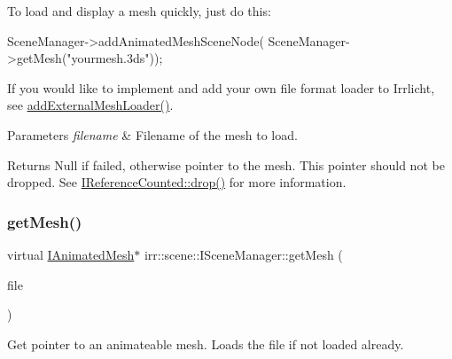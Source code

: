 To load and display a mesh quickly, just do this\+: 
\begin{DoxyCode}
SceneManager->addAnimatedMeshSceneNode(
   SceneManager->getMesh(\textcolor{stringliteral}{"yourmesh.3ds"}));
\end{DoxyCode}
 If you would like to implement and add your own file format loader to Irrlicht, see \hyperlink{classirr_1_1scene_1_1ISceneManager_a808972cc001db86c0576c38b3b3fbbf7}{add\+External\+Mesh\+Loader()}. 
\begin{DoxyParams}{Parameters}
{\em filename} & Filename of the mesh to load. \\
\hline
\end{DoxyParams}
\begin{DoxyReturn}{Returns}
Null if failed, otherwise pointer to the mesh. This pointer should not be dropped. See \hyperlink{classirr_1_1IReferenceCounted_a03856a09355b89d178090c4a5f738543}{I\+Reference\+Counted\+::drop()} for more information. 
\end{DoxyReturn}
\mbox{\label{classirr_1_1scene_1_1ISceneManager_af0ff82d7bac969d6a30f67c7b1fa0c46}} 
\subsubsection{\texorpdfstring{get\+Mesh()}{getMesh()}\hspace{0.1cm}{\footnotesize\ttfamily [2/2]}}
{\footnotesize\ttfamily virtual \hyperlink{classirr_1_1scene_1_1IAnimatedMesh}{I\+Animated\+Mesh}$\ast$ irr\+::scene\+::\+I\+Scene\+Manager\+::get\+Mesh (\begin{DoxyParamCaption}\item[{\hyperlink{classirr_1_1io_1_1IReadFile}{io\+::\+I\+Read\+File} $\ast$}]{file }\end{DoxyParamCaption})\hspace{0.3cm}{\ttfamily [pure virtual]}}



Get pointer to an animateable mesh. Loads the file if not loaded already. 

